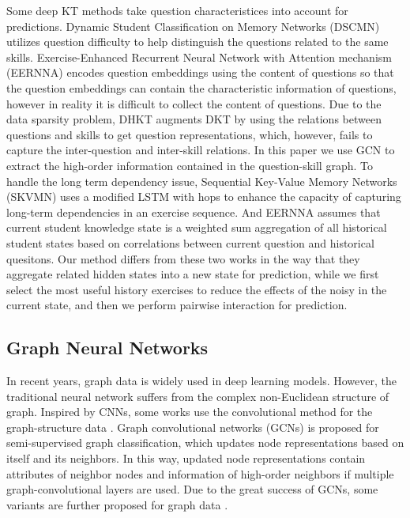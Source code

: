 \documentclass[runningheads]{llncs}
\begin{document}
Some deep KT methods take question characteristices into account for predictions. Dynamic Student Classification on Memory Networks (DSCMN) \cite{minn2019dynamic} utilizes question difficulty to help distinguish the questions related to the same skills. Exercise-Enhanced Recurrent Neural Network with Attention mechanism (EERNNA) \cite{su2018exercise} encodes question embeddings using the content of questions so that the question embeddings can contain the characteristic information of questions, however in reality it is difficult to collect the content of questions. Due to the data sparsity problem, DHKT \cite{DBLP:conf/edm/WangMG19} augments DKT by using the relations between questions and skills to get question representations, which, however, fails to capture the inter-question and inter-skill relations. In this paper we use GCN to extract the high-order information contained in the question-skill graph. To handle the long term dependency issue, Sequential Key-Value Memory Networks (SKVMN) \cite{skvmn} uses a modified LSTM with hops to enhance the capacity of capturing long-term dependencies in an exercise sequence. And EERNNA \cite{su2018exercise} assumes that current student knowledge state is a weighted sum aggregation of all historical student states based on correlations between current question and historical quesitons. Our method differs from these two works in the way that they aggregate related hidden states into a new state for prediction, while we first select the most useful history exercises to reduce the effects of the noisy in the current state, and then we perform pairwise interaction for prediction. 


\subsection{Graph Neural Networks}



In recent years, graph data is widely used in deep learning models. However, the traditional neural network suffers from the complex non-Euclidean structure of graph. Inspired by CNNs, some works use the convolutional method for the graph-structure data \cite{kipf2016semi,defferrard2016convolutional}. Graph convolutional networks (GCNs) \cite{kipf2016semi} is proposed for semi-supervised graph classification, which updates node representations based on itself and its neighbors. In this way, updated node representations contain attributes of neighbor nodes and information of high-order neighbors  if multiple graph-convolutional layers are used. Due to the great success of GCNs, some variants are further proposed for graph data \cite{gat,hamilton2017inductive}.
\end{document}
